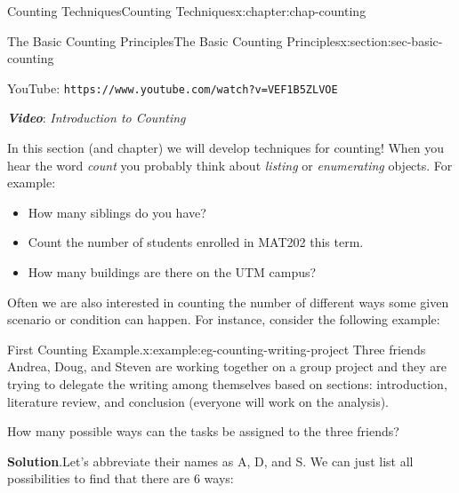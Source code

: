 \documentclass[oneside,10pt,]{book}
\newcommand{\blocktitlefont}{\relax}
\newcommand{\tabularfont}{\relax}
\newcommand{\mono}[1]{\texttt{#1}}
\newcommand{\alert}[1]{\textbf{\textit{#1}}}
\numberwithin{equation}{section}
\newlength{\qrsize}
\newlength{\previewwidth}
\begin{document}
\begin{chapterptx}{Counting Techniques}{}{Counting Techniques}{}{}{x:chapter:chap-counting}
\begin{sectionptx}{The Basic Counting Principles}{}{The Basic Counting Principles}{}{}{x:section:sec-basic-counting}
\begin{sidebyside}{1}{0}{0}{0}
\begin{sbspanel}{1}
\begin{tcbraster}[raster columns=2, raster column skip=1pt, raster halign=center, raster force size=false, raster left skip=0pt, raster right skip=0pt]
\begin{tcolorbox}[previewstyle, width=\previewwidth]
\end{tcolorbox}%
\begin{tcolorbox}[qrstyle]%
{\hypersetup{urlcolor=black}}%
\end{tcolorbox}%
\begin{tcolorbox}[captionstyle]%
\small YouTube: \mono{https://www.youtube.com/watch?v=VEF1B5ZLVOE}\end{tcolorbox}%
\end{tcbraster}%
\end{sbspanel}%
\end{sidebyside}%
\par
\alert{Video}: \emph{Introduction to Counting}%
\par
In this section (and chapter) we will develop techniques for counting! When you hear the word \emph{count} you probably think about \emph{listing} or \emph{enumerating} objects. For example:%
\begin{itemize}[label=\textbullet]
\item{}How many siblings do you have?%
\item{}Count the number of students enrolled in MAT202 this term.%
\item{}How many buildings are there on the UTM campus?%
\end{itemize}
Often we are also interested in counting the number of different ways some given scenario or condition can happen. For instance, consider the following example:%
\begin{example}{First Counting Example.}{x:example:eg-counting-writing-project}%
Three friends Andrea, Doug, and Steven are working together on a group project and they are trying to delegate the writing among themselves based on sections: introduction, literature review, and conclusion (everyone will work on the analysis).%
\par
How many possible ways can the tasks be assigned to the three friends?%
\par\smallskip%
\noindent\textbf{\blocktitlefont Solution}.\hypertarget{g:solution:id525430}{}\quad{}Let's abbreviate their names as A, D, and S. We can just list all possibilities to find that there are 6 ways:%
\begin{sidebyside}{1}{0.2}{0.2}{0}%
\begin{sbspanel}{0.6}%
\resizebox{\linewidth}{!}{%
{\centering%
{\tabularfont%
\begin{tabular}{lllllll}
\multicolumn{1}{lB}{Introduction}&A&A&D&D&S&S\tabularnewline[0pt]

\end{tabular}}}}
\end{sbspanel}
\end{sidebyside}
\end{example}
\end{sectionptx}
\end{chapterptx}
\end{document}

